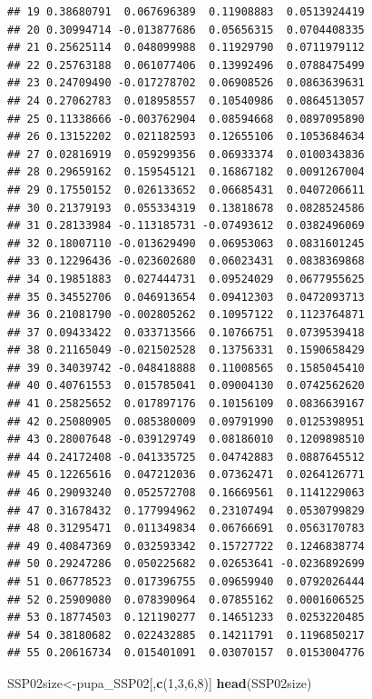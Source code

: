 \documentclass[
]{article}
\newenvironment{Shaded}{\begin{snugshade}}{\end{snugshade}}
\newcommand{\DecValTok}[1]{\textcolor[rgb]{0.00,0.00,0.81}{#1}}
\newcommand{\KeywordTok}[1]{\textcolor[rgb]{0.13,0.29,0.53}{\textbf{#1}}}
\newcommand{\NormalTok}[1]{#1}
\begin{document}
\begin{verbatim}
## 19 0.38680791  0.067696389  0.11908883  0.0513924419
## 20 0.30994714 -0.013877686  0.05656315  0.0704408335
## 21 0.25625114  0.048099988  0.11929790  0.0711979112
## 22 0.25763188  0.061077406  0.13992496  0.0788475499
## 23 0.24709490 -0.017278702  0.06908526  0.0863639631
## 24 0.27062783  0.018958557  0.10540986  0.0864513057
## 25 0.11338666 -0.003762904  0.08594668  0.0897095890
## 26 0.13152202  0.021182593  0.12655106  0.1053684634
## 27 0.02816919  0.059299356  0.06933374  0.0100343836
## 28 0.29659162  0.159545121  0.16867182  0.0091267004
## 29 0.17550152  0.026133652  0.06685431  0.0407206611
## 30 0.21379193  0.055334319  0.13818678  0.0828524586
## 31 0.28133984 -0.113185731 -0.07493612  0.0382496069
## 32 0.18007110 -0.013629490  0.06953063  0.0831601245
## 33 0.12296436 -0.023602680  0.06023431  0.0838369868
## 34 0.19851883  0.027444731  0.09524029  0.0677955625
## 35 0.34552706  0.046913654  0.09412303  0.0472093713
## 36 0.21081790 -0.002805262  0.10957122  0.1123764871
## 37 0.09433422  0.033713566  0.10766751  0.0739539418
## 38 0.21165049 -0.021502528  0.13756331  0.1590658429
## 39 0.34039742 -0.048418888  0.11008565  0.1585045410
## 40 0.40761553  0.015785041  0.09004130  0.0742562620
## 41 0.25825652  0.017897176  0.10156109  0.0836639167
## 42 0.25080905  0.085380009  0.09791990  0.0125398951
## 43 0.28007648 -0.039129749  0.08186010  0.1209898510
## 44 0.24172408 -0.041335725  0.04742883  0.0887645512
## 45 0.12265616  0.047212036  0.07362471  0.0264126771
## 46 0.29093240  0.052572708  0.16669561  0.1141229063
## 47 0.31678432  0.177994962  0.23107494  0.0530799829
## 48 0.31295471  0.011349834  0.06766691  0.0563170783
## 49 0.40847369  0.032593342  0.15727722  0.1246838774
## 50 0.29247286  0.050225682  0.02653641 -0.0236892699
## 51 0.06778523  0.017396755  0.09659940  0.0792026444
## 52 0.25909080  0.078390964  0.07855162  0.0001606525
## 53 0.18774503  0.121190277  0.14651233  0.0253220485
## 54 0.38180682  0.022432885  0.14211791  0.1196850217
## 55 0.20616734  0.015401091  0.03070157  0.0153004776
\end{verbatim}

\begin{Shaded}
\begin{Highlighting}[]
\NormalTok{SSP02size<-pupa_SSP02[,}\KeywordTok{c}\NormalTok{(}\DecValTok{1}\NormalTok{,}\DecValTok{3}\NormalTok{,}\DecValTok{6}\NormalTok{,}\DecValTok{8}\NormalTok{)]}
\KeywordTok{head}\NormalTok{(SSP02size)}
\end{Highlighting}
\end{Shaded}
\end{document}
